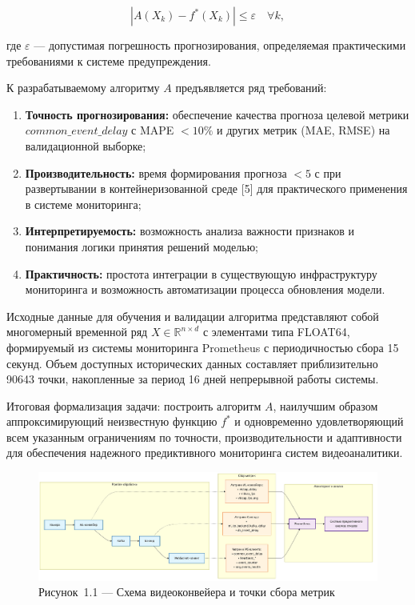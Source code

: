 \begin{equation}
	|A(X_k) - f^*(X_k)| \le \varepsilon \quad \forall k,
\end{equation}

где $\varepsilon$ --- допустимая погрешность прогнозирования, определяемая практическими требованиями к системе предупреждения.

\hspace*{1.25cm}К разрабатываемому алгоритму $A$ предъявляется ряд требований:

\begin{enumerate}
	\item \textbf{Точность прогнозирования:} обеспечение качества прогноза целевой метрики $common\_event\_delay$ с MAPE $< 10\%$ и других метрик (MAE, RMSE) на валидационной выборке;
	\item \textbf{Производительность:} время формирования прогноза $< 5$ с при развертывании в контейнеризованной среде [5] для практического применения в системе мониторинга;
	\item \textbf{Интерпретируемость:} возможность анализа важности признаков и понимания логики принятия решений моделью;
	\item \textbf{Практичность:} простота интеграции в существующую инфраструктуру мониторинга и возможность автоматизации процесса обновления модели.
\end{enumerate}

\hspace*{1.25cm}Исходные данные для обучения и валидации алгоритма представляют собой многомерный временной ряд $X \in \mathbb{R}^{n \times d}$ с элементами типа FLOAT64, формируемый из системы мониторинга Prometheus с периодичностью сбора 15 секунд. Объем доступных исторических данных составляет приблизительно 90643 точки, накопленные за период 16 дней непрерывной работы системы.

\hspace*{1.25cm}Итоговая формализация задачи: построить алгоритм $A$, наилучшим образом аппроксимирующий неизвестную функцию $f^*$ и одновременно удовлетворяющий всем указанным ограничениям по точности, производительности и адаптивности для обеспечения надежного предиктивного мониторинга систем видеоаналитики.

\begin{landscape}
\vspace*{\fill}
\begin{figure}[H]
	\centering
	\includegraphics[width=\linewidth,height=\textheight,keepaspectratio]{figures/chapter1/video_pipeline_diagram.png}
	\caption*{Рисунок~1.1 --- Схема видеоконвейера и точки сбора метрик}
	\label{fig:video_pipeline}
\end{figure}
\vspace*{\fill}
\end{landscape}
